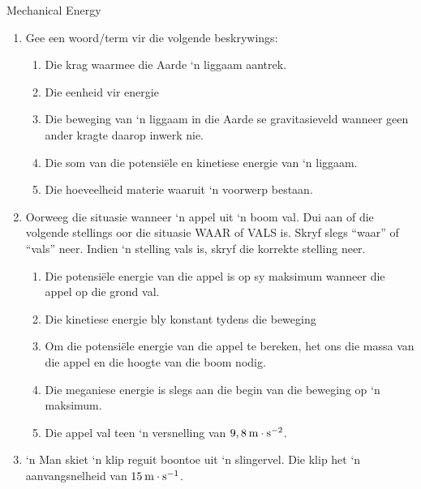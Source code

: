 \begin{eocexercises}{Mechanical Energy}
            \nopagebreak
      \label{m38786*id71520}\begin{enumerate}[noitemsep, label=\textbf{\arabic*}. ] 
            \label{m38786*uid118}\item Gee een woord/term vir die volgende beskrywings:
\label{m38786*id71536}\begin{enumerate}[noitemsep, label=\textbf{\alph*}. ] 
            \label{m38786*uid119}\item Die krag waarmee die Aarde ‘n liggaam aantrek.
\label{m38786*uid120}\item Die eenheid vir energie
\label{m38786*uid121}\item Die beweging van ‘n liggaam in die Aarde se gravitasieveld wanneer geen ander kragte daarop inwerk nie.
\label{m38786*uid122}\item Die som van die potensiële en kinetiese energie van ‘n liggaam.
\label{m38786*uid123}\item Die hoeveelheid materie waaruit ‘n voorwerp bestaan.
\end{enumerate}
                \label{m38786*uid124}\item Oorweeg die situasie wanneer ‘n appel uit ‘n boom val. Dui aan of die volgende stellings oor die situasie WAAR of VALS is. Skryf slegs “waar” of “vals” neer. Indien ‘n stelling vals is, skryf die korrekte stelling neer.
\label{m38786*id71616}\begin{enumerate}[noitemsep, label=\textbf{\alph*}. ] 
            \label{m38786*uid125}\item Die potensiële energie van die appel is op sy maksimum wanneer die appel op die grond val.
\label{m38786*uid126}\item Die kinetiese energie bly konstant tydens die beweging
\label{m38786*uid127}\item Om die potensiële energie van die appel te bereken, het ons die massa van die appel en die hoogte van die boom nodig.
\label{m38786*uid128}\item Die meganiese energie is slegs aan die begin van die beweging op ‘n maksimum.
\label{m38786*uid129}\item Die appel val teen ‘n versnelling van $9,8\phantom{\rule{2pt}{0ex}}\text{m}\ensuremath{\cdot}\text{s}{}^{-2}$.
\end{enumerate}
                \label{m38786*uid131}\item ‘n Man skiet ‘n klip reguit boontoe uit ‘n slingervel. Die klip het ‘n aanvangsnelheid van  $15\phantom{\rule{2pt}{0ex}}\text{m}\ensuremath{\cdot}\text{s}{}^{-1}$.

\end{enumerate}
\end{eocexercises}
